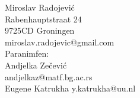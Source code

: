 \documentclass[10pt]{report}
\begin{document}
\begin{center}
	\bigskip
	\bigskip

  	{\Large Miroslav Radojevi\'{c}}\\[0.5em]
  	Rabenhauptstraat 24\\
  	9725CD Groningen\\
  	miroslav.radojevic@gmail.com\\[1em]
  	{\normalsize Paranimfen:}\\[0.5em]
  	Andjelka Ze\v{c}evi\'{c}\\
  	andjelkaz@matf.bg.ac.rs\\[0.5em]
  	Eugene Katrukha
  	y.katrukha@uu.nl
  
\end{center}

\end{document}
